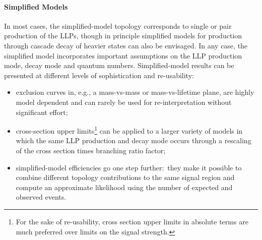 \paragraph{Simplified Models}%
In most cases, the simplified-model topology corresponds to single or pair
production of the LLPs, though in principle simplified models for production
through cascade decay of heavier states can also be envisaged.
In any case, the simplified model incorporates important assumptions
on the LLP production mode, decay mode and quantum numbers.
Simplified-model results can be presented at different levels of sophistication and re-usability:
\begin{itemize}
\item exclusion curves in, e.g., a mass-vs-mass or mass-vs-lifetime plane, are highly model dependent and can
rarely be used for re-interpretation without significant effort;
\item cross-section upper limits\footnote{For the sake of re-usability, cross section upper limits in absolute terms are much preferred over limits on the signal strength.}
can be applied to a larger variety of models
in which the same LLP production and decay mode occurs
through a rescaling of the cross section times branching
ratio factor;
\item simplified-model efficiencies go one step further:~they make
it possible to combine different topology contributions to the same signal
region and compute an approximate likelihood using the number of expected and
observed events.
\end{itemize}

